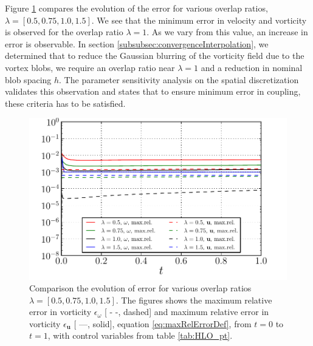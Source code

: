 Figure \ref{fig:lambOseen_parameter_overlap} compares the evolution of the error for various overlap ratios, $\lambda = [0.5, 0.75, 1.0, 1.5]$. We see that the minimum error in velocity and vorticity is observed for the overlap ratio $\lambda = 1$. As we vary from this value, an increase in error is observable. In section \ref{subsubsec:convergenceInterpolation}, we determined that to reduce the Gaussian blurring of the vorticity field due to the vortex blobs, we require an overlap ratio near $\lambda=1$ and a reduction in nominal blob spacing $h$. The parameter sensitivity analysis on the spatial discretization validates this observation and states that to ensure minimum error in coupling, these criteria has to be satisfied.

	\begin{figure}[!h]
	\centering
	\includegraphics[width=0.6\linewidth]{./figures/hybrid/lambOseen/lambOseen_parameter_overlap.pdf}
	\caption{Comparison the evolution of error for various overlap ratios $\lambda = [0.5, 0.75, 1.0, 1.5]$. The figures shows the maximum relative error in vorticity $\epsilon_{\omega}$ [ - -, dashed] and maximum relative error in vorticity $\epsilon_{\mathbf{u}}$ [ ---, solid], equation \ref{eq:maxRelErrorDef}, from $t=0$ to $t=1$, with control variables from table \ref{tab:HLO_pt}.}
	\label{fig:lambOseen_parameter_overlap}
	\end{figure}	

